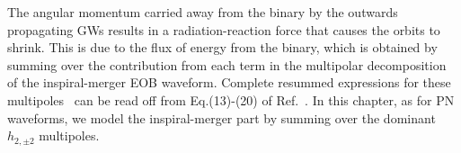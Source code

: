 The angular momentum carried away from the binary
by the outwards propagating GWs results in a radiation-reaction force
that causes the orbits to shrink.
This is due to the flux of energy from the binary, which
is obtained by summing over the contribution from each term in the multipolar
decomposition of the inspiral-merger EOB waveform.
Complete resummed expressions for these multipoles~\cite{DamourFluxhlm01} can be 
read off from Eq.(13)-(20) of Ref.~\cite{BuonannoEOBv2Main}. In this chapter, 
as for PN waveforms, we model the inspiral-merger part 
by summing over the dominant $h_{2,\pm 2}$ multipoles.

